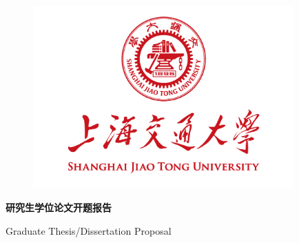 \documentclass[a4paper,zihao=-4,AutoFakeBold]{ctexart}
\begin{document}
\pagestyle{empty}

\begin{figure}[h]
    \centering
    \includegraphics[width=10cm]{figures/sjtu-logo.png}
\end{figure}

\begin{center}
    \bfseries
    \vspace{-0.5cm}
     研究生学位论文开题报告\par\vspace{18.8pt}
     Graduate Thesis/Dissertation Proposal
    \vspace{0.5cm}
\end{center}
\end{document}

